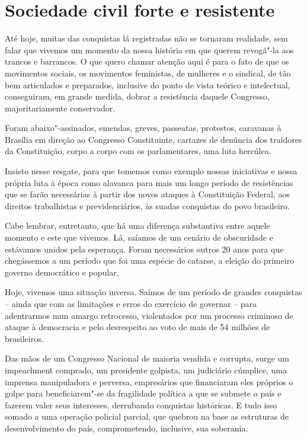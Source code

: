 \section{Sociedade civil forte e resistente}

Até hoje, muitas das conquistas lá registradas não se tornaram
realidade, sem falar que vivemos um momento da nossa história em que
querem revogá"-la aos trancos e barrancos. O que quero chamar
atenção aqui é para o fato de que os movimentos sociais, os movimentos
feministas, de mulheres e o sindical, de tão bem
articulados e preparados, inclusive do ponto de vista teórico e
intelectual, conseguiram, em grande medida, dobrar a resistência daquele
Congresso, majoritariamente conservador.

Foram abaixo"-assinados, emendas, greves, passeatas, protestos, caravanas
à Brasília em direção ao Congresso Constituinte, cartazes de denúncia dos traidores
da Constituição, corpo a corpo com os parlamentares, uma luta hercúlea.

Insisto nesse resgate, para que tomemos como exemplo nossas iniciativas
e nossa própria luta à época como alavanca para mais um longo período de
resistências que se farão necessárias à partir dos novos ataques à
Constituição Federal, aos direitos trabalhistas e previdenciários, às
suadas conquistas do povo brasileiro.

Cabe lembrar, entretanto, que há uma diferença substantiva entre aquele
momento e este que vivemos. Lá, saíamos de um cenário de obscuridade e
estávamos unidos pela esperança. Foram necessários outros 20 anos para
que chegássemos a um período que foi uma espécie de catarse, a eleição
do primeiro governo democrático e popular.

Hoje, vivemos uma situação inversa. Saímos de um período de grandes
conquistas -- ainda que com as limitações e erros do exercício de
governar -- para adentrarmos num amargo retrocesso, violentados por um
processo criminoso de ataque à democracia e pelo desrespeito ao voto de
mais de 54 milhões de brasileiros.

Das mãos de um Congresso Nacional de maioria vendida e corrupta, surge
um impeachment comprado, um presidente golpista, um judiciário cúmplice,
uma imprensa manipuladora e perversa, empresários que financiaram eles
próprios o golpe para beneficiarem"-se da fragilidade política a que
se submete o país e fazerem valer seus interesses, derrubando conquistas
históricas. E tudo isso somado a uma operação policial parcial, que
quebrou na base as estruturas de desenvolvimento do país, comprometendo,
inclusive, sua soberania.

